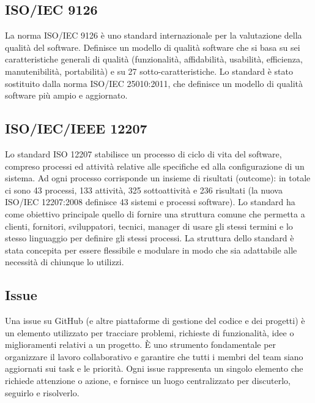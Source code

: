 \hypertarget{ISO/IEC 9126}{}
\subsection*{ISO/IEC 9126}
La norma ISO/IEC 9126 è uno standard internazionale per la valutazione della qualità del software.
Definisce un modello di qualità software che si basa su sei caratteristiche generali di qualità (funzionalità, affidabilità, usabilità, efficienza,
manutenibilità, portabilità) e su 27 sotto-caratteristiche.
Lo standard è stato sostituito dalla norma ISO/IEC 25010:2011, che definisce un modello di qualità software più ampio e aggiornato.

\hypertarget{ISO/IEC/IEEE 12207}{}
\subsection*{ISO/IEC/IEEE 12207}
Lo standard ISO 12207 stabilisce un processo di ciclo di vita del software, compreso processi ed attività relative alle specifiche ed alla configurazione di un sistema.
Ad ogni processo corrisponde un insieme di risultati (outcome): in totale ci sono 43 processi, 133 attività, 325 sottoattività e 236 risultati (la nuova ISO/IEC 12207:2008 definisce 43 sistemi e processi software).
Lo standard ha come obiettivo principale quello di fornire una struttura comune che permetta a clienti, fornitori, sviluppatori, tecnici, manager di usare gli stessi termini e lo stesso linguaggio per definire gli stessi processi.
La struttura dello standard è stata concepita per essere flessibile e modulare in modo che sia adattabile alle necessità di chiunque lo utilizzi.

\subsection*{Issue}
Una issue su GitHub (e altre piattaforme di gestione del codice e dei progetti) è un elemento utilizzato per tracciare problemi, richieste di funzionalità, 
idee o miglioramenti relativi a un progetto. È uno strumento fondamentale per organizzare il lavoro collaborativo e garantire che tutti i membri del team 
siano aggiornati sui task e le priorità. Ogni issue rappresenta un singolo elemento che richiede attenzione o azione, e fornisce un luogo centralizzato per 
discuterlo, seguirlo e risolverlo.

\newpage